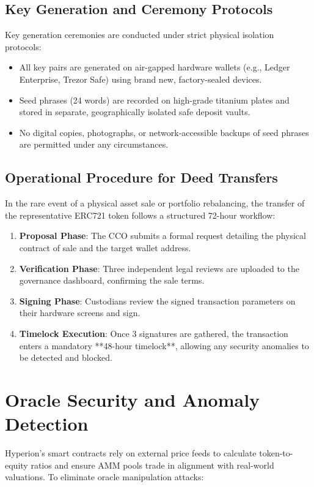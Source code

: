 \documentclass[11pt]{article}
\begin{document}
\subsection{Key Generation and Ceremony Protocols}
Key generation ceremonies are conducted under strict physical isolation protocols:
\begin{itemize}
    \item All key pairs are generated on air-gapped hardware wallets (e.g., Ledger Enterprise, Trezor Safe) using brand new, factory-sealed devices.
    \item Seed phrases (24 words) are recorded on high-grade titanium plates and stored in separate, geographically isolated safe deposit vaults.
    \item No digital copies, photographs, or network-accessible backups of seed phrases are permitted under any circumstances.
\end{itemize}

\subsection{Operational Procedure for Deed Transfers}
In the rare event of a physical asset sale or portfolio rebalancing, the transfer of the representative ERC721 token follows a structured 72-hour workflow:
\begin{enumerate}
    \item \textbf{Proposal Phase}: The CCO submits a formal request detailing the physical contract of sale and the target wallet address.
    \item \textbf{Verification Phase}: Three independent legal reviews are uploaded to the governance dashboard, confirming the sale terms.
    \item \textbf{Signing Phase}: Custodians review the signed transaction parameters on their hardware screens and sign.
    \item \textbf{Timelock Execution}: Once 3 signatures are gathered, the transaction enters a mandatory **48-hour timelock**, allowing any security anomalies to be detected and blocked.
\end{enumerate}

\section{Oracle Security and Anomaly Detection}
Hyperion's smart contracts rely on external price feeds to calculate token-to-equity ratios and ensure AMM pools trade in alignment with real-world valuations. To eliminate oracle manipulation attacks:
\end{document}
